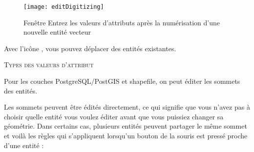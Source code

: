 \begin{itemize}
\begin{figure}[ht]
  \begin{center}
  \caption{Fenêtre Entrez les valeurs d'attributs après la numérisation d'une nouvelle entité vecteur \nixcaption}\label{fig:vector_digitising}\smallskip
  \texttt{[image: editDigitizing]}
\end{center}
\end{figure}

Avec l'icône , vous pouvez déplacer des entités existantes.

\begin{Astuce}[ht]\caption{\textsc{Types des valeurs d'attribut}}
\end{Astuce}


Pour les couches PostgreSQL/PostGIS et shapefile, on peut éditer les sommets des entités.

Les sommets peuvent être édités directement, ce qui signifie que vous n'avez pas à choisir quelle entité vous voulez éditer avant que vous puissiez changer sa géométrie. Dans certains cas, plusieurs entités peuvent partager le même sommet et voilà les règles qui s'appliquent lorsqu'un bouton de la souris est pressé proche d'une entité :


\end{itemize}

